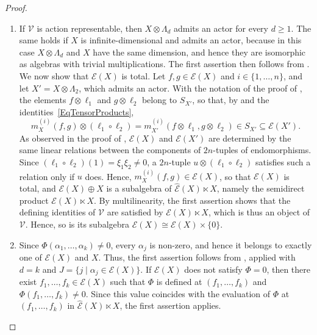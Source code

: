 \documentclass[reqno,a4paper]{amsart}
\theoremstyle{plain}
\theoremstyle{definition}
\theoremstyle{remark}
\numberwithin{equation}{section}
\newcommand{\E}{\mathcal{E}}
\newcommand{\V}{\mathcal{V}}
\begin{document}
\begin{proof}{\ }
\begin{enumerate}
\item[(1)] If $\V$ is action representable, then $X\otimes\Lambda_d$ admits an actor for every $d\geq1$. The same holds if $X$ is infinite-dimensional and admits an actor, because in this case $X\otimes\Lambda_d$ and $X$ have the same dimension, and hence they are isomorphic as algebras with trivial multiplications. The first assertion then follows from . We now show that $\E(X)$ is total. Let $f,g\in\E(X)$ and $i\in\{1,\ldots,n\}$, and let $X'=X\otimes\Lambda_2$, which admits an actor. With the notation of the proof of , the elements $f\otimes\ell_1$ and $g\otimes\ell_2$ belong to $S_{X'}$, so that, by  and the identities~\eqref{EqTensorProducts},
\[
m_X^{(i)}(f,g)\otimes(\ell_1\circ\ell_2)=m_{X'}^{(i)}(f\otimes\ell_1,g\otimes\ell_2)\in S_{X'}\subseteq\E(X').
\]
As observed in the proof of , $\E(X)$ and $\E(X')$ are determined by the same linear relations between the components of $2n$-tuples of endomorphisms. Since $(\ell_1\circ\ell_2)(1)=\xi_1\xi_2\neq0$, a $2n$-tuple $u\otimes(\ell_1\circ\ell_2)$ satisfies such a relation only if $u$ does. Hence, $m_X^{(i)}(f,g)\in\E(X)$, so that $\E(X)$ is total, and $\E(X)\oplus X$ is a subalgebra of $\widehat{\E}(X)\ltimes X$, namely the semidirect product $\E(X)\ltimes X$. By multilinearity, the first assertion shows that the defining identities of $\V$ are satisfied by $\E(X)\ltimes X$, which is thus an object of $\V$. Hence, so is its subalgebra $\E(X)\cong\E(X)\times\{0\}$.

\item[(2)] Since $\Phi(\alpha_1,\ldots,\alpha_k)\neq0$, every $\alpha_j$ is non-zero, and hence it belongs to exactly one of $\E(X)$ and $X$. Thus, the first assertion follows from , applied with $d=k$ and $J=\{j\mid\alpha_j\in\E(X)\}$. If $\E(X)$ does not satisfy $\Phi=0$, then there exist $f_1,\ldots,f_k\in\E(X)$ such that $\Phi$ is defined at $(f_1,\ldots,f_k)$ and $\Phi(f_1,\ldots,f_k)\neq0$. Since this value coincides with the evaluation of $\Phi$ at $(f_1,\ldots,f_k)$ in $\widehat{\E}(X)\ltimes X$, the first assertion applies.
\end{enumerate}
\end{proof}
\end{document}
